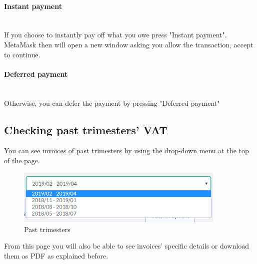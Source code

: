 	\paragraph{Instant payment} \mbox{}\\
	If you choose to instantly pay off what you owe press "Instant 
	payment". MetaMask then will open a new window asking you allow the 
	transaction, accept to continue.
	\paragraph{Deferred payment} \mbox{}\\
	Otherwise, you can defer the payment by pressing "Deferred payment" 
	\subsection{Checking past trimesters' VAT}
	You can see invoices of past trimesters by using the drop-down 
	menu at the top of the page.
	\begin{figure}[H]
		\includegraphics[width=10cm]{res/images/past_trimesters.png}
		\centering
		\caption{Past trimesters}
	\end{figure}
	\noindent From this page you will also be able to see invoices' specific 
	details or download them as PDF as explained before.